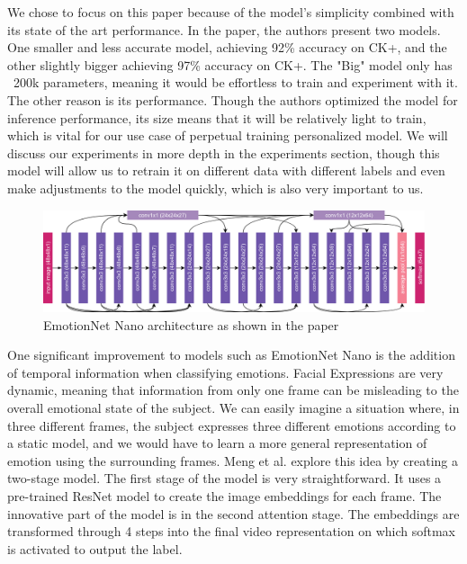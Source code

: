 \documentclass[../main.tex]{subfiles}
\begin{document}
We chose to focus on this paper because of the model's simplicity combined with its state of the art performance. In the paper,
the authors present two models. One smaller and less accurate model, achieving 92\% accuracy on CK+,
and the other slightly bigger achieving 97\% accuracy on CK+. The "Big" model only has ~200k parameters, meaning it would be effortless to
train and experiment with it. The other reason is its performance. Though the authors optimized the model for inference performance,
its size means that it will be relatively light to train, which is vital for our use case of perpetual training personalized model.
We will discuss our experiments in more depth in the experiments section, though this model will allow us to retrain it on different data
with different labels and even make adjustments to the model quickly, which is also very important to us.
\par

\begin{figure}[htp]
    \centering
    \includegraphics[width=12cm]{figures/emotionnet_nano.png}   
    \caption{EmotionNet Nano architecture as shown in the paper \cite{emotionnet-nano}}
    \label{fig:emotionnet_nano} 
\end{figure}

One significant improvement to models such as EmotionNet Nano is the addition of temporal information when classifying emotions.
Facial Expressions are very dynamic, meaning that information from only one frame can be misleading to the overall emotional state of the subject.
We can easily imagine a situation where, in three different frames, the subject expresses three different emotions according to a static model,
and we would have to learn a more general representation of emotion using the surrounding frames.
Meng et al. \cite{fan} explore this idea by creating a two-stage model. The first stage of the model is very straightforward.
It uses a pre-trained ResNet model to create the image embeddings for each frame. The innovative part of the model is in the second attention stage.
The embeddings are transformed through 4 steps into the final video representation on which softmax is activated to output the label.
\end{document}
